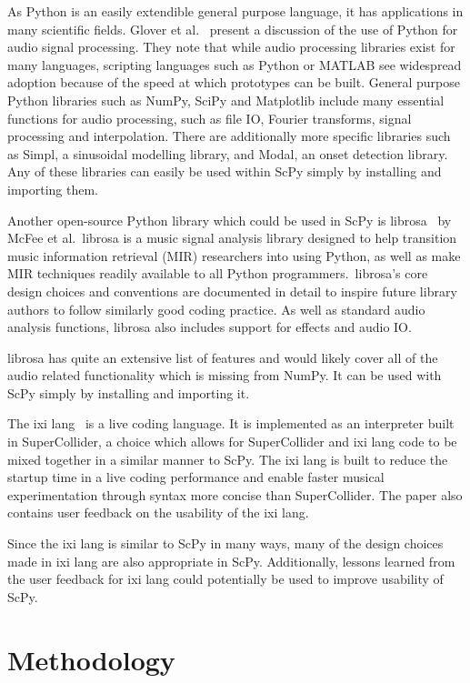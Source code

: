 \documentclass{article}
\begin{document}
As Python is an easily extendible general purpose language, it has applications in many scientific
fields. Glover et al.~\cite{glover2011python} present a discussion of the use of Python for audio
signal processing. They note that while audio processing libraries exist for many languages,
scripting languages such as Python or MATLAB see widespread adoption because of the speed at which
prototypes can be built. General purpose Python libraries such as NumPy, SciPy and Matplotlib
include many essential functions for audio processing, such as file IO, Fourier transforms, signal
processing and interpolation. There are additionally more specific libraries such as Simpl, a
sinusoidal modelling library, and Modal, an onset detection library. Any of these libraries can
easily be used within ScPy simply by installing and importing them.

Another open-source Python library which could be used in ScPy is librosa~\cite{mcfee2015librosa}
by McFee et al.\ librosa is a music signal analysis library designed to help transition music
information retrieval (MIR) researchers into using Python, as well as make MIR techniques readily
available to all Python programmers.\ librosa's core design choices and conventions are documented
in detail to inspire future library authors to follow similarly good coding practice. As well as
standard audio analysis functions, librosa also includes support for effects and audio IO.\@

librosa has quite an extensive list of features and would likely cover all of the audio related
functionality which is missing from NumPy. It can be used with ScPy simply by installing and importing
it.

The ixi lang~\cite{magnusson2011ixi} is a live coding language. It is implemented as an interpreter
built in SuperCollider, a choice which allows for SuperCollider and ixi lang code to be mixed
together in a similar manner to ScPy. The ixi lang is built to reduce the startup time in a live
coding performance and enable faster musical experimentation through syntax more concise than
SuperCollider. The paper also contains user feedback on the usability of the ixi lang.

Since the ixi lang is similar to ScPy in many ways, many of the design choices made in ixi lang are
also appropriate in ScPy. Additionally, lessons learned from the user feedback for ixi lang could
potentially be used to improve usability of ScPy.

\section{Methodology}\label{sec:methodology}
\end{document}
